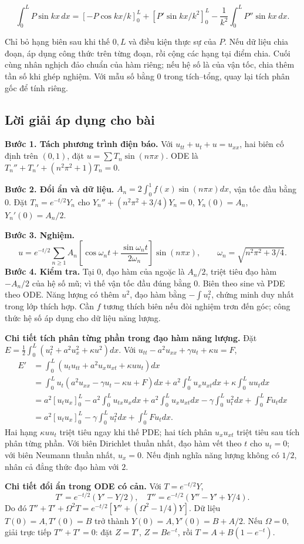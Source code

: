 \documentclass[10pt,a4paper]{article}
\begin{document}
\[
\int_0^L P\sin kx\,dx
=\left[-P\cos kx/k\right]_0^L+
\left[P'\sin kx/k^2\right]_0^L-
\frac1{k^2}\int_0^L P''\sin kx\,dx.
\]


Chỉ bỏ hạng biên sau khi thế $0,L$ và điều kiện thực sự của $P$. Nếu dữ liệu chia đoạn, áp dụng công thức trên từng đoạn, rồi cộng các hạng tại điểm chia. Cuối cùng nhân nghịch đảo chuẩn của hàm riêng; nếu hệ số là của vận tốc, chia thêm tần số khi ghép nghiệm. Với mẫu số bằng $0$ trong tích–tổng, quay lại tích phân gốc để tính riêng.
\subsection*{Lời giải áp dụng cho bài}
\textbf{Bước 1. Tách phương trình điện báo.} Với $u_{tt}+u_t+u=u_{xx}$, hai biên cố định trên $(0,1)$, đặt $u=\sum T_n\sin(n\pi x)$. ODE là $T_n''+T_n'+(n^2\pi^2+1)T_n=0$.

\textbf{Bước 2. Đổi ẩn và dữ liệu.} $A_n=2\int_0^1f(x)\sin(n\pi x)dx$, vận tốc đầu bằng $0$. Đặt $T_n=e^{-t/2}Y_n$ cho $Y_n''+(n^2\pi^2+3/4)Y_n=0$, $Y_n(0)=A_n$, $Y_n'(0)=A_n/2$.

\textbf{Bước 3. Nghiệm.}
\[u=e^{-t/2}\sum_{n\ge1}A_n\left[\cos\omega_nt+\frac{\sin\omega_nt}{2\omega_n}\right]\sin(n\pi x),\qquad\omega_n=\sqrt{n^2\pi^2+3/4}.\]
\textbf{Bước 4. Kiểm tra.} Tại $0$, đạo hàm của ngoặc là $A_n/2$, triệt tiêu đạo hàm $-A_n/2$ của hệ số mũ; vì thế vận tốc đầu đúng bằng $0$. Biên theo sine và PDE theo ODE. Năng lượng có thêm $u^2$, đạo hàm bằng $-\int u_t^2$, chứng minh duy nhất trong lớp thích hợp. Cần $f$ tương thích biên nếu đòi nghiệm trơn đến góc; công thức hệ số áp dụng cho dữ liệu năng lượng.

\textbf{Chi tiết tích phân từng phần trong đạo hàm năng lượng.} Đặt $E=\frac12\int_0^L(u_t^2+a^2u_x^2+\kappa u^2)dx$. Với $u_{tt}-a^2u_{xx}+\gamma u_t+\kappa u=F$,
\[\begin{aligned}
E'&=\int_0^L(u_tu_{tt}+a^2u_xu_{xt}+\kappa uu_t)dx\\
&=\int_0^Lu_t(a^2u_{xx}-\gamma u_t-\kappa u+F)dx
+a^2\int_0^Lu_xu_{xt}dx+\kappa\int_0^Luu_tdx\\
&=a^2[u_tu_x]_0^L-a^2\int_0^Lu_{tx}u_xdx
+a^2\int_0^Lu_xu_{xt}dx-\gamma\int_0^Lu_t^2dx+\int_0^LFu_tdx\\
&=a^2[u_tu_x]_0^L-\gamma\int_0^Lu_t^2dx+\int_0^LFu_tdx.
\end{aligned}\]
Hai hạng $\kappa uu_t$ triệt tiêu ngay khi thế PDE; hai tích phân $u_xu_{xt}$ triệt tiêu sau tích phân từng phần. Với biên Dirichlet thuần nhất, đạo hàm vết theo $t$ cho $u_t=0$; với biên Neumann thuần nhất, $u_x=0$. Nếu định nghĩa năng lượng không có $1/2$, nhân cả đẳng thức đạo hàm với $2$.

\textbf{Chi tiết đổi ẩn trong ODE có cản.} Với $T=e^{-t/2}Y$,
\[T'=e^{-t/2}(Y'-Y/2),\quad T''=e^{-t/2}(Y''-Y'+Y/4).\]
Do đó $T''+T'+\Omega^2T=e^{-t/2}[Y''+(\Omega^2-1/4)Y]$. Dữ liệu $T(0)=A,T'(0)=B$ trở thành $Y(0)=A,Y'(0)=B+A/2$. Nếu $\Omega=0$, giải trực tiếp $T''+T'=0$: đặt $Z=T'$, $Z=Be^{-t}$, rồi $T=A+B(1-e^{-t})$.
\end{document}
